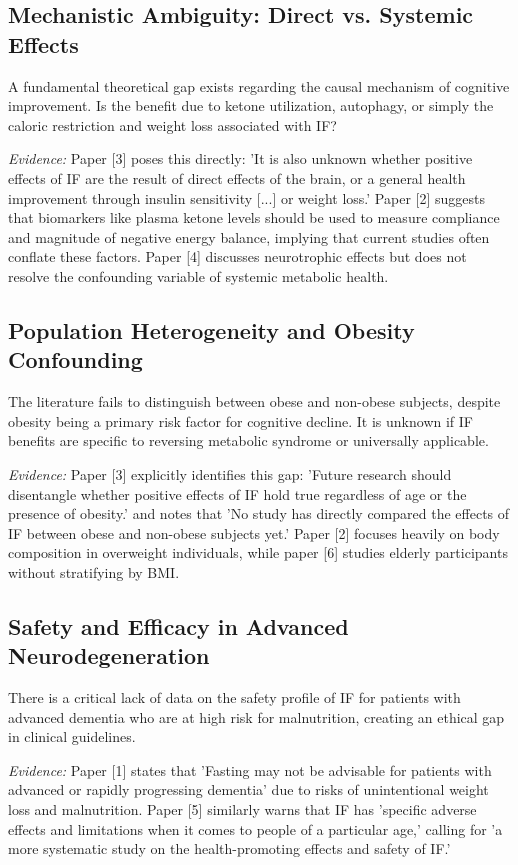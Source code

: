 \documentclass[11pt]{article}
\begin{document}
\subsection{Mechanistic Ambiguity: Direct vs. Systemic Effects}
A fundamental theoretical gap exists regarding the causal mechanism of cognitive improvement. Is the benefit due to ketone utilization, autophagy, or simply the caloric restriction and weight loss associated with IF?

\textit{Evidence:} Paper [3] poses this directly: 'It is also unknown whether positive effects of IF are the result of direct effects of the brain, or a general health improvement through insulin sensitivity [...] or weight loss.' Paper [2] suggests that biomarkers like plasma ketone levels should be used to measure compliance and magnitude of negative energy balance, implying that current studies often conflate these factors. Paper [4] discusses neurotrophic effects but does not resolve the confounding variable of systemic metabolic health.

\subsection{Population Heterogeneity and Obesity Confounding}
The literature fails to distinguish between obese and non-obese subjects, despite obesity being a primary risk factor for cognitive decline. It is unknown if IF benefits are specific to reversing metabolic syndrome or universally applicable.

\textit{Evidence:} Paper [3] explicitly identifies this gap: 'Future research should disentangle whether positive effects of IF hold true regardless of age or the presence of obesity.' and notes that 'No study has directly compared the effects of IF between obese and non-obese subjects yet.' Paper [2] focuses heavily on body composition in overweight individuals, while paper [6] studies elderly participants without stratifying by BMI.

\subsection{Safety and Efficacy in Advanced Neurodegeneration}
There is a critical lack of data on the safety profile of IF for patients with advanced dementia who are at high risk for malnutrition, creating an ethical gap in clinical guidelines.

\textit{Evidence:} Paper [1] states that 'Fasting may not be advisable for patients with advanced or rapidly progressing dementia' due to risks of unintentional weight loss and malnutrition. Paper [5] similarly warns that IF has 'specific adverse effects and limitations when it comes to people of a particular age,' calling for 'a more systematic study on the health-promoting effects and safety of IF.'
\end{document}
